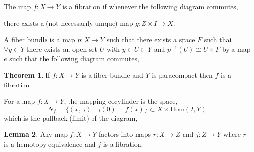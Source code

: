 \documentclass[12pt]{extarticle}
\newcommand{\Hom}[2]{\mathrm{Hom}\left( #1, #2 \right)}
\theoremstyle{definition}
\newtheorem{theorem}{Theorem}[section]
\newtheorem{lemma}[theorem]{Lemma}
\newenvironment{definition}[1][Definition:]{\begin{trivlist}
\item[\hskip \labelsep {\bfseries #1}]}{\end{trivlist}}
\begin{document}
\begin{definition}
The map $f : X \to Y$ is a fibration if whenever the following diagram commutes,
\begin{center}
\end{center}
there exists a (not necessarily unique) map $g: Z \times I \to X$. 
\end{definition}

\begin{definition}
A fiber bundle is a map $p : X \to Y$ such that there exists a space $F$ such that $\forall y \in Y$ there exists an open set $U$ with $y \in U \subset Y$ and $p^{-1}(U) \cong U \times F$ by a map $e$ such that the following diagram commutes,
\begin{center}
\end{center}
\end{definition}

\begin{theorem}
If $f : X \to Y$ is a fiber bundle and $Y$ is paracompact then $f$ is a fibration.
\end{theorem}


\begin{definition}
For a map $f : X \to Y$, the mapping cocylinder is the space,
\[ N_f  = \{(x, \gamma) \mid \gamma(0) = f(x) \} \subset X \times \Hom{I}{Y} \]
which is the pullback (limit) of the diagram,
\begin{center}
\end{center}  
\end{definition}

\begin{lemma}
Any map $f : X \to Y$ factors into maps $r : X \to Z$ and $j : Z \to Y$ where $r$ is a homotopy equivalence and $j$ is a fibration.
\end{lemma}
\end{document}
